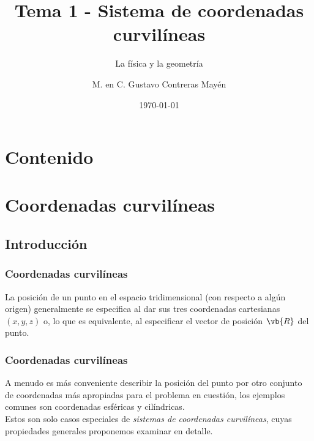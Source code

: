 
\title{\large{Tema 1 - Sistema de coordenadas curvilíneas}}
\subtitle{La física y la geometría}
\author{M. en C. Gustavo Contreras Mayén}
\date{\today}

\maketitle
\fontsize{14}{14}\selectfont
{}
\section*{Contenido}
\section{Coordenadas curvilíneas}
\subsection{Introducción}
\begin{frame}
\frametitle{Coordenadas curvilíneas}
La posición de un punto en el espacio tridimensional (con respecto a algún origen) generalmente se especifica al dar sus tres coordenadas cartesianas $(x, y, z)$ o, lo que es equivalente, al especificar el vector de posición $\vb{R}$ del punto.
\end{frame}
\begin{frame}
\frametitle{Coordenadas curvilíneas}
A menudo es más conveniente describir la posición del punto por otro conjunto de coordenadas más apropiadas para el problema en cuestión, los ejemplos comunes son coordenadas esféricas y cilíndricas.
\\
\bigskip
\pause
Estos son solo casos especiales de \emph{sistemas de coordenadas curvilíneas}, cuyas propiedades generales proponemos examinar en detalle.
\end{frame}
